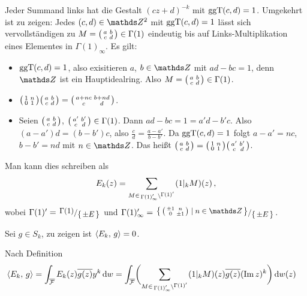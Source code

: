 \begin{bewe}
\begin{bewe}
	Jeder Summand links hat die Gestalt $(cz+d)^{-k}$ mit $\operatorname{ggT}(c,d) = 1$.
	Umgekehrt ist zu zeigen:
	Jedes $(c,d) \in \ZZ^2$ mit $\operatorname{ggT}(c,d) = 1$ lässt sich vervollständigen zu $M = \mymat abcd \in \Gamma(1)$ eindeutig bis auf Links-Multiplikation eines Elementes in $\Gamma(1)_\infty$.
	Es gilt:
	
	\begin{itemize}
		\item $\operatorname{ggT}(c,d) = 1$, also exisitieren $a$, $b \in \ZZ$ mit $ad - bc = 1$, denn $\ZZ$ ist ein Hauptidealring.
		Also $M = \mymat abcd \in \Gamma(1)$.
		
		\item $\mymat 1n01 \mymat abcd = \mymat {a+nc}{b+nd}c{d}$.
		
		\item Seien $\mymat abcd$, $\mymat {a'}{b'}cd \in \Gamma(1)$. Dann $ad-bc = 1 = a'd-b'c$.
		Also $(a-a') d = (b-b')c$, also $\frac{c}{d} = \frac{a-a'}{b-b'}$.
		Da $\operatorname{ggT}(c,d) = 1$ folgt $a-a' = nc$, $b-b' = nd$ mit $n \in \ZZ$.
		Das heißt $\mymat abcd = \mymat 1n01 \mymat{a'}{b'}cd$.
	\end{itemize}
\end{bewe}

	Man kann dies schreiben als
	\[
		E_k(z)
		= \sum_{M \in \linksmodulo{\Gamma(1)_\infty'}{\Gamma(1)'}} (1|_k M)(z)\,,
	\]
	wobei $\Gamma(1)' = \modulo{\Gamma(1)}{\Set{\pm E}}$ und $\Gamma(1)'_\infty = \modulo{\Set{\mymat{\pm1}n0{\pm1} \mid n \in \ZZ}}{\Set{\pm E}}$.
	
	Sei $g \in S_k$, zu zeigen ist $\scalarprd{E_k}g = 0$.
	
	Nach Definition
	\begin{align*}
		\scalarprd{E_k}g &= \int_{\closure \F} E_k(z) \conj{g(z)} y^k \opd w
		= \int_{\closure \F} \biggl(\sum_{M \in \linksmodulo{\Gamma(1)_\infty'}{\Gamma(1)'}} (1|_kM)(z) \conj{g(z)} (\Im z)^k \biggr) \opd w(z)
	\end{align*}
	

\end{bewe}
